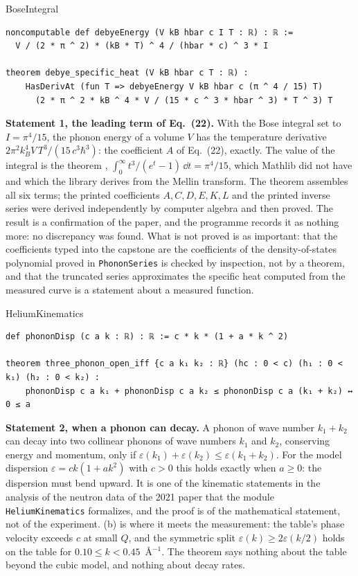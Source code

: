 \begin{leanbox}[title={Lean 4 \enspace Statement 1 \enspace BoseIntegral}]{BoseIntegral}
\begin{lstlisting}[style=lean]
noncomputable def debyeEnergy (V kB hbar c I T : ℝ) : ℝ :=
  V / (2 * π ^ 2) * (kB * T) ^ 4 / (hbar * c) ^ 3 * I

theorem debye_specific_heat (V kB hbar c T : ℝ) :
    HasDerivAt (fun T => debyeEnergy V kB hbar c (π ^ 4 / 15) T)
      (2 * π ^ 2 * kB ^ 4 * V / (15 * c ^ 3 * hbar ^ 3) * T ^ 3) T
\end{lstlisting}
\end{leanbox}
\textbf{Statement 1, the leading term of Eq.~(22).} With the Bose integral set to $I=\pi^4/15$, the phonon energy of a volume $V$ has the temperature derivative $2\pi^2k_B^4V\,T^3/(15\,c^3\hbar^3)$: the coefficient $A$ of Eq.~(22), exactly. The value of the integral is the theorem , $\int_0^\infty t^3/(e^t-1)\,\dd t=\pi^4/15$, which Mathlib did not have and which the library derives from the Mellin transform. The theorem  assembles all six terms; the printed coefficients $A,C,D,E,K,L$ and the printed inverse series were derived independently by computer algebra and then proved. The result is a confirmation of the paper, and the programme records it as nothing more: no discrepancy was found. What is not proved is as important: that the coefficients typed into the capstone are the coefficients of the density-of-states polynomial proved in \texttt{PhononSeries} is checked by inspection, not by a theorem, and that the truncated series approximates the specific heat computed from the measured curve is a statement about a measured function.

\begin{leanbox}[title={Lean 4 \enspace Statement 2 \enspace HeliumKinematics}]{HeliumKinematics}
\begin{lstlisting}[style=lean]
def phononDisp (c a k : ℝ) : ℝ := c * k * (1 + a * k ^ 2)

theorem three_phonon_open_iff {c a k₁ k₂ : ℝ} (hc : 0 < c) (h₁ : 0 < k₁) (h₂ : 0 < k₂) :
    phononDisp c a k₁ + phononDisp c a k₂ ≤ phononDisp c a (k₁ + k₂) ↔ 0 ≤ a
\end{lstlisting}
\end{leanbox}
\textbf{Statement 2, when a phonon can decay.} A phonon of wave number $k_1+k_2$ can decay into two collinear phonons of wave numbers $k_1$ and $k_2$, conserving energy and momentum, only if $\varepsilon(k_1)+\varepsilon(k_2)\le\varepsilon(k_1+k_2)$. For the model dispersion $\varepsilon=ck(1+ak^2)$ with $c>0$ this holds exactly when $a\ge0$: the dispersion must bend upward. It is one of the kinematic statements in the analysis of the neutron data of the 2021 paper that the module \texttt{HeliumKinematics} formalizes, and the proof is of the mathematical statement, not of the experiment. (b) is where it meets the measurement: the table's phase velocity exceeds $c$ at small $Q$, and the symmetric split $\varepsilon(k)\ge2\varepsilon(k/2)$ holds on the table for $0.10\le k<0.45$~\AA$^{-1}$. The theorem says nothing about the table beyond the cubic model, and nothing about decay rates.

